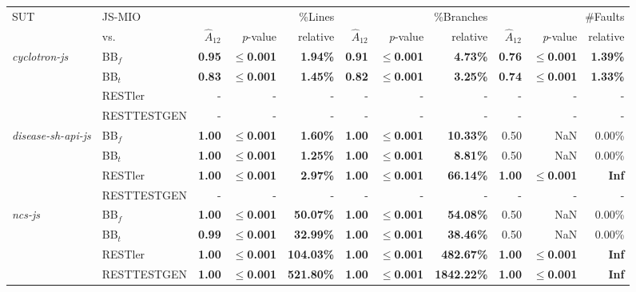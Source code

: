 \begin{tabular}{ l l r r r |r r r |r r r}\\ 
\toprule 
SUT & JS-MIO& \multicolumn{3}{r|}{\%Lines} &  \multicolumn{3}{r|}{\%Branches} &  \multicolumn{3}{r}{\#Faults} \\ 
& vs. &$\hat{A}_{12}$ & \emph{p}-value & relative &$\hat{A}_{12}$ & \emph{p}-value & relative &$\hat{A}_{12}$ & \emph{p}-value & relative \\ 
\midrule 
\emph{cyclotron-js} & BB$_f$ & \textbf{0.95} & \textbf{$\le $0.001} & \textbf{1.94\%} & \textbf{0.91} & \textbf{$\le $0.001} & \textbf{4.73\%} & \textbf{0.76} & \textbf{$\le $0.001} & \textbf{1.39\%} \\ 
 & BB$_t$ & \textbf{0.83} & \textbf{$\le $0.001} & \textbf{1.45\%} & \textbf{0.82} & \textbf{$\le $0.001} & \textbf{3.25\%} & \textbf{0.74} & \textbf{$\le $0.001} & \textbf{1.33\%} \\ 
 & RESTler & - & - & -& - & - & -& - & - & - \\ 
  & RESTTESTGEN & - & - & -& - & - & -& - & - & - \\ 
 \emph{disease-sh-api-js} & BB$_f$ & \textbf{1.00} & \textbf{$\le $0.001} & \textbf{1.60\%} & \textbf{1.00} & \textbf{$\le $0.001} & \textbf{10.33\%} & 0.50 & NaN & 0.00\% \\ 
 & BB$_t$ & \textbf{1.00} & \textbf{$\le $0.001} & \textbf{1.25\%} & \textbf{1.00} & \textbf{$\le $0.001} & \textbf{8.81\%} & 0.50 & NaN & 0.00\% \\ 
 & RESTler & \textbf{1.00} & \textbf{$\le $0.001} & \textbf{2.97\%} & \textbf{1.00} & \textbf{$\le $0.001} & \textbf{66.14\%} & \textbf{1.00} & \textbf{$\le $0.001} & \textbf{Inf} \\ 
 & RESTTESTGEN & - & - & -& - & - & -& - & - & - \\ 
 \emph{ncs-js} & BB$_f$ & \textbf{1.00} & \textbf{$\le $0.001} & \textbf{50.07\%} & \textbf{1.00} & \textbf{$\le $0.001} & \textbf{54.08\%} & 0.50 & NaN & 0.00\% \\ 
 & BB$_t$ & \textbf{0.99} & \textbf{$\le $0.001} & \textbf{32.99\%} & \textbf{1.00} & \textbf{$\le $0.001} & \textbf{38.46\%} & 0.50 & NaN & 0.00\% \\ 
 & RESTler & \textbf{1.00} & \textbf{$\le $0.001} & \textbf{104.03\%} & \textbf{1.00} & \textbf{$\le $0.001} & \textbf{482.67\%} & \textbf{1.00} & \textbf{$\le $0.001} & \textbf{Inf} \\ 
 & RESTTESTGEN & \textbf{1.00} & \textbf{$\le $0.001} & \textbf{521.80\%} & \textbf{1.00} & \textbf{$\le $0.001} & \textbf{1842.22\%} & \textbf{1.00} & \textbf{$\le $0.001} & \textbf{Inf} \\ 

\end{tabular}
